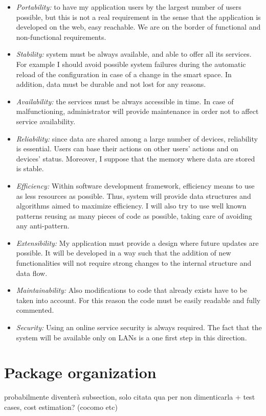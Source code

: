 \begin{itemize}
	\item \textit{Portability:} to have my application users by the largest number of users possible, but this is not a real requirement in the sense that the application is developed on the web, easy reachable. We are on the border of functional and non-functional requirements.
	
	\item \textit{Stability:} system must be always available, and able to offer all its services. For example I should avoid possible system failures during the automatic reload of the configuration in case of a change in the smart space. In addition, data must be durable and not lost for any reasons.
	
	\item \textit{Availability:} the services must be always accessible in time. In case of malfunctioning, administrator will provide maintenance in order not to affect service availability.
	
	\item \textit{Reliability:} since data are shared among a large number of devices, reliability is essential. Users can base their actions on other users’ actions and on devices' status. Moreover, I suppose that the memory where data are stored is stable.
	
	\item \textit{Efficiency:} Within software development framework, efficiency means to use as less resources as possible. Thus, system will provide data structures and algorithms aimed to maximize efficiency. I will also try to use well known patterns reusing as many pieces of code as possible, taking care of avoiding any anti-pattern.
	
	\item \textit{Extensibility:} My application must provide a design where future updates are possible. It will be developed in a way such that the addition of new functionalities will not require strong changes to the internal structure and data flow.
	
	\item \textit{Maintainability:} Also modifications to code that already exists have to be taken into account. For this reason the code must be easily readable and fully commented.

	\item \textit{Security:} Using an online service security is always required. The fact that the system will be available only on LANs is a one first step in this direction.

\end{itemize}

\section{Package organization}
probabilmente diventerà subsection, solo citata qua per non dimenticarla + test cases, cost estimation? (cocomo etc)

